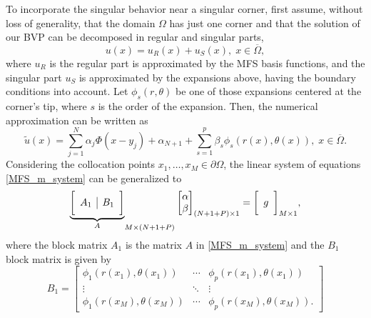 To incorporate the singular behavior near a singular corner, first assume, without loss of generality, that the domain \(\Omega\) has just one corner and that the solution of our \ac{BVP} can be decomposed in regular and singular parts,
\[
    u(x) = u_R(x) + u_S(x), \; x \in \overline{\Omega},
\]
where \(u_R\) is the regular part is approximated by the \ac{MFS} basis functions, and the singular part \(u_S\) is approximated by the expansions above, having the boundary conditions into account. Let \(\phi_s(r, \theta)\) be one of those expansions centered at the corner's tip, where \(s\) is the order of the expansion. Then, the numerical approximation can be written as
\begin{equation}
    \tilde{u}(x) = \sum_{j=1}^{N}\alpha_j \Phi(x-y_j) + \alpha_{N+1} + \sum_{s=1}^{p} \beta_s \phi_s(r(x),\theta(x)), \; x \in \overline{\Omega}.
\end{equation}
Considering the collocation points \(x_1,\dots,x_M \in \partial \Omega\), the linear system of equations \eqref{MFS_m_system} can be generalized to
\begin{equation}
    {\underbrace{\bigg[ \begin{array}{c | c}
        A_1 & B_1 \\
    \end{array} \bigg]}_{A}}_{M\times(N+1+P)}
    \begin{bmatrix}
        \alpha\\
        \beta
    \end{bmatrix}_{(N+1+P)\times 1}
    =
    \bigg[ \begin{array}{c}
        g \\
    \end{array} \bigg]_{M\times 1},
\end{equation}
where the block matrix \(A_1\) is the matrix \(A\) in \eqref{MFS_m_system} and the \(B_1\) block matrix is given by
\[
    B_1=\begin{bmatrix}
        \phi_1(r(x_1), \theta(x_1)) & \cdots & \phi_p(r(x_1), \theta(x_1)) \\
        \vdots & \ddots & \vdots\\
        \phi_1(r(x_M), \theta(x_M)) & \cdots & \phi_p(r(x_M), \theta(x_M)).
    \end{bmatrix}
\]


